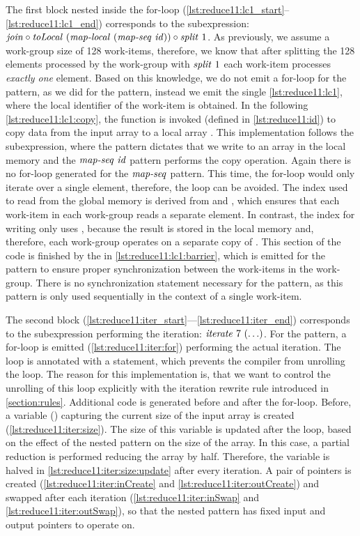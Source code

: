 The first block nested inside the for-loop (\autoref{lst:reduce11:lc1_start}--\ref{lst:reduce11:lc1_end}) corresponds to the subexpression:
$\text{\textit{join}} \circ \text{\textit{toLocal}}\ (\text{\textit{map-local}}\ (\text{\textit{map-seq}}\ \text{\textit{id}})) \circ \text{\textit{split}}\ 1$.
As previously, we assume a work-group size of 128 work-items, therefore, we know that after splitting the 128 elements processed by the work-group with $\text{\textit{split}}\ 1$ each work-item processes \emph{exactly one} element.
Based on this knowledge, we do not emit a for-loop for the \mapLocal pattern, as we did for the \mapWorkgroup pattern, instead we emit the single \autoref{lst:reduce11:lc1}, where the local identifier of the work-item is obtained.
In the following \autoref{lst:reduce11:lc1:copy}, the  function is invoked (defined in \autoref{lst:reduce11:id}) to copy data from the input array to a local array .
This implementation follows the subexpression, where the \toLocal pattern dictates that we write to an array in the local memory and the $\text{\textit{map-seq}}\ \text{\textit{id}}$ pattern performs the copy operation.
Again there is no for-loop generated for the $\text{\textit{map-seq}}$ pattern.
This time, the for-loop would only iterate over a single element, therefore, the loop can be avoided.
The index used to read from the global memory is derived from  and , which ensures that each work-item in each work-group reads a separate element.
In contrast, the index for writing only uses , because the result is stored in the local memory and, therefore, each work-group operates on a separate copy of .
This section of the code is finished by the  in \autoref{lst:reduce11:lc1:barrier}, which is emitted for the \mapLocal pattern to ensure proper synchronization between the work-items in the work-group.
There is no synchronization statement necessary for the \mapSeq pattern, as this pattern is only used sequentially in the context of a single work-item.

The second block (\autoref{lst:reduce11:iter_start}---\autoref{lst:reduce11:iter_end}) corresponds to the subexpression performing the iteration:
$\text{\textit{iterate}}\ 7\ (\ldots)$.
For the \iterateN pattern, a for-loop is emitted (\autoref{lst:reduce11:iter:for}) performing the actual iteration.
The loop is annotated with a  statement, which prevents the \OpenCL compiler from unrolling the loop.
The reason for this implementation is, that we want to control the unrolling of this loop explicitly with the iteration rewrite rule introduced in \autoref{section:rules}.
Additional code is generated before and after the for-loop.
Before, a variable () capturing the current size of the input array is created (\autoref{lst:reduce11:iter:size}).
The size of this variable is updated after the loop, based on the effect of the nested pattern on the size of the array.
In this case, a partial reduction is performed reducing the array by half.
Therefore, the  variable is halved in \autoref{lst:reduce11:iter:size:update} after every iteration.
A pair of pointers is created (\autoref{lst:reduce11:iter:inCreate} and \autoref{lst:reduce11:iter:outCreate}) and swapped after each iteration (\autoref{lst:reduce11:iter:inSwap} and \autoref{lst:reduce11:iter:outSwap}), so that the nested pattern has fixed input and output pointers to operate on.

